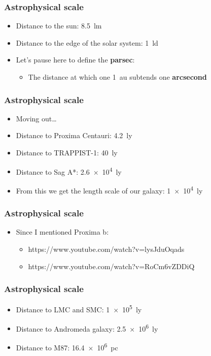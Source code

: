 \documentclass{beamer}
\begin{document}
\begin{frame}
  \frametitle{Astrophysical scale}
  \begin{itemize}
    \item Distance to the sun: \SI{8.5}{lm}
    \item Distance to the edge of the solar system: \SI{1}{ld}
    \item Let's pause here to define the \textbf{parsec}:
      \begin{itemize}
	\item The distance at which one \SI{1}{au} subtends one \textbf{arcsecond}
      \end{itemize}
  \end{itemize}
\end{frame}

\begin{frame}
  \frametitle{Astrophysical scale}
  \begin{itemize}
    \item Moving out\ldots
    \item Distance to Proxima Centauri: \SI{4.2}{ly}
    \item Distance to TRAPPIST-1: \SI{40}{ly}
    \item Distance to Sag A*: \SI{2.6e4}{ly}
    \item From this we get the length scale of our galaxy: \SI{1e4}{ly}
  \end{itemize}
\end{frame}

\begin{frame}
  \frametitle{Astrophysical scale}
  \begin{itemize}
    \item Since I mentioned Proxima b:
      \begin{itemize}
	\item https://www.youtube.com/watch?v=lysJduOqads 
	\item https://www.youtube.com/watch?v=RoCm6vZDDiQ
      \end{itemize}
  \end{itemize}
\end{frame}

\begin{frame}
  \frametitle{Astrophysical scale}
  \begin{itemize}
    \item Distance to LMC and SMC: \SI{1e5}{ly}
    \item Distance to Andromeda galaxy: \SI{2.5e6}{ly}
    \item Distance to M87: \SI{16.4e6}{pc}
  \end{itemize}
\end{frame}
\end{document}
